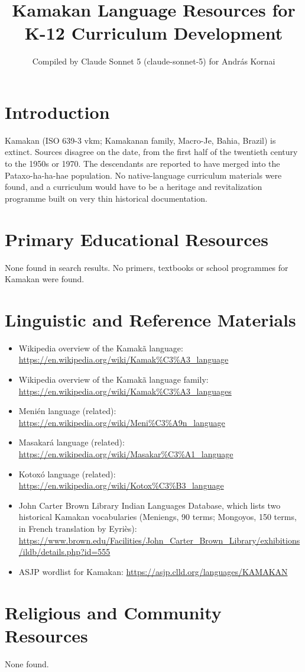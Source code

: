 \documentclass[12pt]{article}
\title{Kamakan Language Resources for K-12 Curriculum Development}
\author{Compiled by Claude Sonnet 5 (claude-sonnet-5) for Andr\'as Kornai}
\date{}
\begin{document}
\maketitle
\section{Introduction}
Kamakan (ISO 639-3 vkm; Kamakanan family, Macro-Je, Bahia, Brazil) is extinct. Sources disagree on the date, from the first half of the twentieth century to the 1950s or 1970. The descendants are reported to have merged into the Pataxo-ha-ha-hae population. No native-language curriculum materials were found, and a curriculum would have to be a heritage and revitalization programme built on very thin historical documentation.
\section{Primary Educational Resources}
None found in search results. No primers, textbooks or school programmes for Kamakan were found.
\section{Linguistic and Reference Materials}
\begin{itemize}
\item Wikipedia overview of the Kamak\~a language: \url{https://en.wikipedia.org/wiki/Kamak%C3%A3_language}
\item Wikipedia overview of the Kamak\~a language family: \url{https://en.wikipedia.org/wiki/Kamak%C3%A3_languages}
\item Meni\'en language (related): \url{https://en.wikipedia.org/wiki/Meni%C3%A9n_language}
\item Masakar\'a language (related): \url{https://en.wikipedia.org/wiki/Masakar%C3%A1_language}
\item Kotox\'o language (related): \url{https://en.wikipedia.org/wiki/Kotox%C3%B3_language}
\item John Carter Brown Library Indian Languages Database, which lists two historical Kamakan vocabularies (Meniengs, 90 terms; Mongoyos, 150 terms, in French translation by Eyri\`es): \url{https://www.brown.edu/Facilities/John_Carter_Brown_Library/exhibitions/ildb/details.php?id=555}
\item ASJP wordlist for Kamakan: \url{https://asjp.clld.org/languages/KAMAKAN}
\end{itemize}
\section{Religious and Community Resources}
None found.
\end{document}

